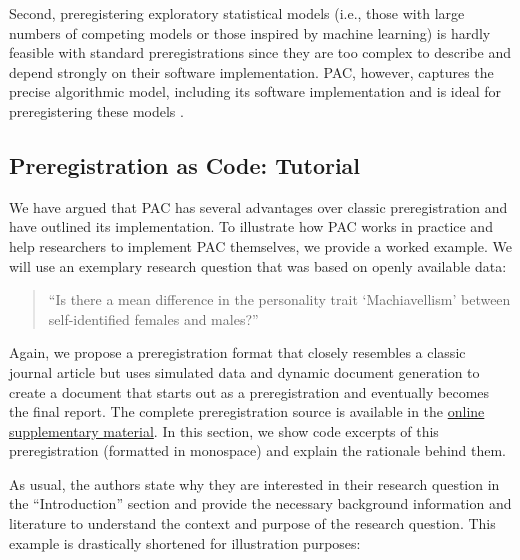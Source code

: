 \documentclass[psych,tutorial,submit,moreauthors,pdftex]{mdpi}
\begin{document}
Second, preregistering exploratory statistical models (i.e., those with
large numbers of competing models or those inspired by machine learning)
is hardly feasible with standard preregistrations since they are too
complex to describe and depend strongly on their software
implementation. PAC, however, captures the precise algorithmic model,
including its software implementation and is ideal for preregistering
these models \citep{brandmaier22mlsem}.

\hypertarget{preregistration-as-code-tutorial}{%
\subsection{Preregistration as Code:
Tutorial}\label{preregistration-as-code-tutorial}}

We have argued that PAC has several advantages over classic
preregistration and have outlined its implementation. To illustrate how
PAC works in practice and help researchers to implement PAC themselves,
we provide a worked example. We will use an exemplary research question
that was based on openly available data:

\begin{quote}
``Is there a mean difference in the personality trait `Machiavellism'
between self-identified females and males?''
\end{quote}

Again, we propose a preregistration format that closely resembles a
classic journal article but uses simulated data and dynamic document
generation to create a document that starts out as a preregistration and
eventually becomes the final report. The complete preregistration source
is available in the
\href{https://github.com/aaronpeikert/repro-tutorial/blob/main/preregistration.Rmd}{online
supplementary material}. In this section, we show code excerpts of this
preregistration (formatted in monospace) and explain the rationale
behind them.

As usual, the authors state why they are interested in their research
question in the ``Introduction'' section and provide the necessary
background information and literature to understand the context and
purpose of the research question. This example is drastically shortened
for illustration purposes:
\end{document}
